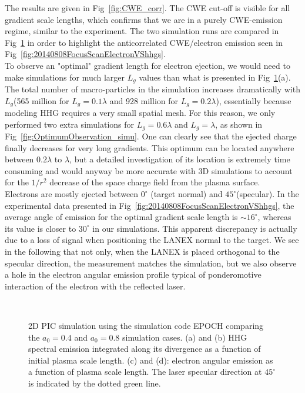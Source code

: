 The results are given in Fig~\ref{fig:CWE_corr}. The CWE cut-off is visible for all gradient scale lengths, which confirms that we are in a purely CWE-emission regime, similar to the experiment. The two simulation runs are compared in Fig~\ref{fig:AntiCorrelationSimu} in order to highlight the anticorrelated CWE/electron emission seen in Fig~\ref{fig:20140808FocusScanElectronVShhgs}.\\


\noindent To observe an "optimal" gradient length for electron ejection, we would need to make simulations for much larger $L_g$ values than what is presented in Fig~\ref{fig:AntiCorrelationSimu}(a). The total number of macro-particles in the simulation increases dramatically with $L_g$(565 million for $L_g  = 0.1\lambda$ and 928 million for $ L_g=0.2\lambda$), essentially because modeling HHG requires a very small spatial mesh. For this reason, we only performed two extra simulations for  $L_g = 0.6\lambda$ and $L_g = \lambda$, as shown in Fig~\ref{fig:OptimumObservation_simu}. One can clearly see that the ejected charge finally decreases for very long gradients. This optimum can be located anywhere between $0.2\lambda$ to $\lambda$, but a detailed investigation of its location is extremely time consuming and would anyway be more accurate with 3D simulations to account for the $1/r^2$ decrease of the space charge field from the plasma surface. \\


\noindent Electrons are mostly ejected between $0^{\circ}$ (target normal) and $45^{\circ}$(specular). In the experimental data presented in Fig~\ref{fig:20140808FocusScanElectronVShhgs}, the average angle of emission for the optimal gradient scale length is $\sim 16^{\circ}$, whereas its value is closer to $30^{\circ}$ in our simulations. This apparent discrepancy is actually due to a loss of signal when positioning the LANEX normal to the target. We see in the following that not only, when the LANEX is placed orthogonal to the specular direction, the measurement matches the simulation, but we also observe a hole in the electron angular emission profile typical of ponderomotive interaction of the electron with the reflected laser. 



\begin{figure}[H]
\\
\caption{\label{fig:AntiCorrelationSimu}
2D PIC simulation using the simulation code EPOCH comparing the $a_0 = 0.4$ and $a_0 =0.8$ simulation cases. (a) and (b) HHG spectral emission integrated along its divergence as a function of initial plasma scale length. (c) and (d): electron angular emission as a function of plasma scale length. The laser specular direction at $45^{\circ}$ is indicated by the dotted green line.}
\end{figure}


